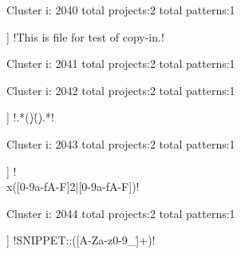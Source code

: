 Cluster i: 2040
total projects:2
total patterns:1
\begin{multicols}{1}
\begin{description}[noitemsep,topsep=0pt]
\item [[2] ] \cverb!This is file for test of copy-in.!
\end{description}
\end{multicols}







Cluster i: 2041
total projects:2
total patterns:1
\begin{multicols}{1}
\end{multicols}







Cluster i: 2042
total projects:2
total patterns:1
\begin{multicols}{1}
\begin{description}[noitemsep,topsep=0pt]
\item [[2] ] \cverb!.*\srelease\s(\d)\.(\d)\s.*!
\end{description}
\end{multicols}







Cluster i: 2043
total projects:2
total patterns:1
\begin{multicols}{1}
\begin{description}[noitemsep,topsep=0pt]
\item [[2] ] \cverb!\\x([0-9a-fA-F]{2}|[0-9a-fA-F])!
\end{description}
\end{multicols}







Cluster i: 2044
total projects:2
total patterns:1
\begin{multicols}{1}
\begin{description}[noitemsep,topsep=0pt]
\item [[2] ] \cverb!SNIPPET::([A-Za-z0-9_\-\/\.]+)!
\end{description}
\end{multicols}







